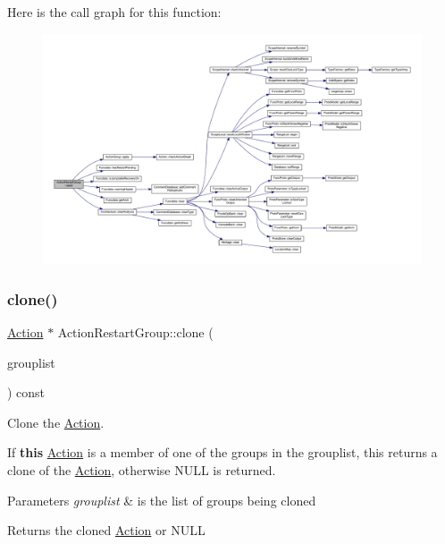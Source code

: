 Here is the call graph for this function\+:
\nopagebreak
\begin{figure}[H]
\begin{center}
\leavevmode
\includegraphics[width=350pt]{class_action_restart_group_ab597697ab15a9b8f1a25832f43bdeb0d_cgraph}
\end{center}
\end{figure}
\mbox{\label{class_action_restart_group_a2dd3daab632e0a41e64d9515f47c7200}} 
\subsubsection{\texorpdfstring{clone()}{clone()}}
{\footnotesize\ttfamily \mbox{\hyperlink{class_action}{Action}} $\ast$ Action\+Restart\+Group\+::clone (\begin{DoxyParamCaption}\item[{const \mbox{\hyperlink{class_action_group_list}{Action\+Group\+List}} \&}]{grouplist }\end{DoxyParamCaption}) const\hspace{0.3cm}{\ttfamily [virtual]}}



Clone the \mbox{\hyperlink{class_action}{Action}}. 

If {\bfseries{this}} \mbox{\hyperlink{class_action}{Action}} is a member of one of the groups in the grouplist, this returns a clone of the \mbox{\hyperlink{class_action}{Action}}, otherwise N\+U\+LL is returned. 
\begin{DoxyParams}{Parameters}
{\em grouplist} & is the list of groups being cloned \\
\hline
\end{DoxyParams}
\begin{DoxyReturn}{Returns}
the cloned \mbox{\hyperlink{class_action}{Action}} or N\+U\+LL 
\end{DoxyReturn}


